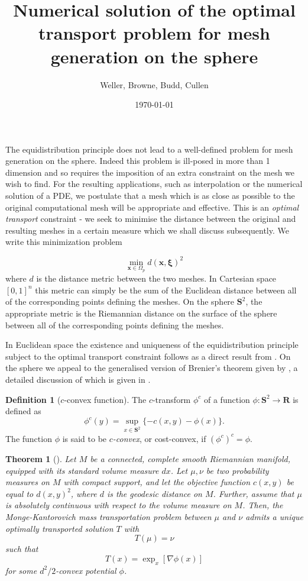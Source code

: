 \documentclass{article}
\author[1,*]{Weller, Browne, Budd, Cullen}
\title{Numerical solution of the optimal transport problem for mesh generation on the sphere}
\date{\today}
\newtheorem{theorem}{Theorem}
\theoremstyle{definition}
\newtheorem{defn}{Definition}
\begin{document}
\linenumbers
\maketitle

The equidistribution principle does not lead to a well-defined problem for mesh generation on the sphere. Indeed this problem is ill-posed in more than 1 dimension and so requires the imposition of an extra constraint on the mesh we wish to find. For the resulting applications, such as interpolation or the numerical solution of a PDE, we postulate that a mesh which is as close as possible to the original computational mesh will be appropriate and effective. This is an \emph{optimal transport} constraint - we seek to minimise the distance between the original and resulting meshes in a certain measure which we shall discuss subsequently. We write this minimization problem

\[\min_{\mathbf{x}\in \Omega_p} d(\mathbf{x},\mathbf{\xi})^2\]
where $d$ is the distance metric between the two meshes. In Cartesian space $[0,1]^n$ this metric can simply be the sum of the Euclidean distance between all of the corresponding points defining the meshes. On the sphere $\mathbf{S}^2$, the appropriate metric is the Riemannian distance on the surface of the sphere between all of the corresponding points defining the meshes.

In Euclidean space the existence and uniqueness of the equidistribution principle subject to the optimal transport constraint follows as a direct result from \citet{Brenier1991}. On the sphere we appeal to the generalised version of Brenier's theorem given by \citet{McCann2001}, a detailed discussion of which is given in \citet{villani2003}.

\begin{defn}[$c$-convex function]
The $c$-transform $\phi^c$ of a function $\phi: \mathbf{S}^2 \to \mathbf{R}$ is defined as 
\[\phi^c (y) = \sup_{x\in\mathbf{S}^2} \{-c(x,y) - \phi(x)\}.\]
The function $\phi$ is said to be \emph{$c$-convex}, or cost-convex, if 
$(\phi^c)^c=\phi.$
\end{defn}

\begin{theorem}[\citet{McCann2001}]\label{mccannthm}
Let $M$ be a connected, complete smooth Riemannian manifold, equipped with its standard volume measure $dx$. Let $\mu, \nu$ be two probability measures on $M$ with compact support, and let the objective function $c(x,y)$ be equal to $d(x,y)^2$, where $d$ is the geodesic distance on $M$. Further, assume that $\mu$ is absolutely continuous with respect to the volume measure on $M$. Then, the Monge-Kantorovich mass transportation problem between $\mu$ and $\nu$ admits a unique optimally transported solution $T$ with
\[T(\mu) = \nu\]
such that
\[T(x) = \exp_x [\nabla \phi(x)]\]
for some $d^2/2$-convex potential $\phi$. 
\end{theorem}
\end{document}
